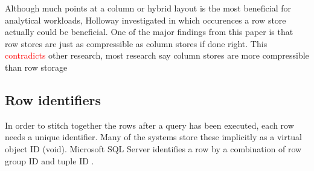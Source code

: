 Although much points at a column or hybrid layout is the most beneficial for analytical workloads, Holloway \ea \cite{Holloway2008-rr} investigated in which occurences a row store actually could be beneficial. One of the major findings from this paper is that row stores are just as compressible as column stores if done right. This \textcolor{red}{contradicts} other research, most research say column stores are more compressible than row storage

\subsection{Row identifiers}
\label{sub:Row identifiers}
In order to stitch together the rows after a query has been executed, each row needs a unique identifier. Many of the systems store these implicitly \cite{Boncz2002-yj, Raman2013-em, Stonebraker2005-qz, Lamb2012-kg} as a virtual object ID (void). Microsoft SQL Server identifies a row by a combination of row group ID and tuple ID \cite{Larson2013-mc}.




